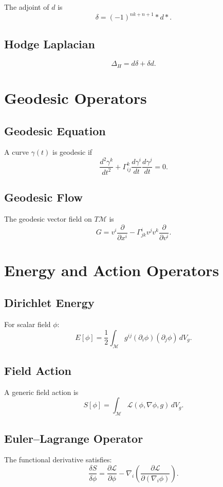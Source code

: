 The adjoint of $d$ is
\[
\delta = (-1)^{nk + n + 1} \ast d \ast.
\]

\subsection{Hodge Laplacian}

\[
\Delta_H = d\delta + \delta d.
\]

\section{Geodesic Operators}

\subsection{Geodesic Equation}

A curve $\gamma(t)$ is geodesic if
\[
\frac{d^2\gamma^k}{dt^2}
  + \Gamma^k_{ij}
    \frac{d\gamma^i}{dt}
    \frac{d\gamma^j}{dt}
  = 0.
\]

\subsection{Geodesic Flow}

The geodesic vector field on $T\mathcal{M}$ is
\[
G = v^i \frac{\partial}{\partial x^i}
  - \Gamma^i_{jk} v^j v^k
    \frac{\partial}{\partial v^i}.
\]

\section{Energy and Action Operators}

\subsection{Dirichlet Energy}

For scalar field $\phi$:
\[
E[\phi]
  = \frac12 \int_{\mathcal{M}}
      g^{ij}(\partial_i\phi)(\partial_j\phi)\, dV_g.
\]

\subsection{Field Action}

A generic field action is
\[
S[\phi] = \int_{\mathcal{M}}
  \mathcal{L}(\phi,\nabla\phi,g)\, dV_g.
\]

\subsection{Euler–Lagrange Operator}

The functional derivative satisfies:
\[
\frac{\delta S}{\delta \phi}
  = \frac{\partial\mathcal{L}}{\partial\phi}
  - \nabla_i \left(\frac{\partial\mathcal{L}}{\partial(\nabla_i\phi)}\right).
\]


